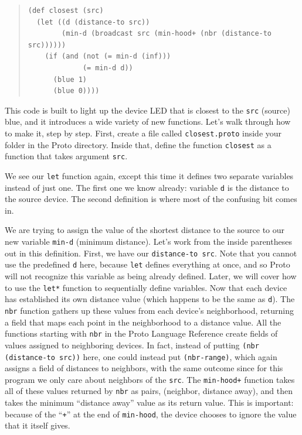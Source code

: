 \documentclass{article}
\newcommand\var[1]{{\tt #1}}
\newcommand\qvar[1]{``{\tt #1}''}
\begin{document}
\begin{quote}
\begin{verbatim}
(def closest (src) 
  (let ((d (distance-to src)) 
        (min-d (broadcast src (min-hood+ (nbr (distance-to src)))))) 
    (if (and (not (= min-d (inf))) 
             (= min-d d)) 
      (blue 1)
      (blue 0))))
\end{verbatim}
\end{quote}

This code is built to light up the device LED that is closest to the
\var{src} (source) blue, and it introduces a wide variety of new
functions.  Let's walk through how to make it, step by step.  First,
create a file called \var{closest.proto} inside your folder in the
Proto directory.  Inside that, define the function \var{closest} as a
function that takes argument \var{src}.

We see our \var{let} function again, except this time it defines two
separate variables instead of just one.  The first one we know
already: variable \var{d} is the distance to the source device. The
second definition is where most of the confusing bit comes in.

We are trying to assign the value of the shortest distance to the
source to our new variable \var{min-d} (minimum distance).  Let's work
from the inside parentheses out in this definition.  First, we have
our \var{distance-to src}.  Note that you cannot use the predefined
\var{d} here, because \var{let} defines everything at once, and so
Proto will not recognize this variable as being already defined.
Later, we will cover how to use the \var{let*} function to
sequentially define variables.  Now that each device has established its
own distance value (which happens to be the same as \var{d}).  The
\var{nbr} function gathers up these values from each device's
neighborhood, returning a field that maps each point in the
neighborhood to a distance value.  All the functions starting with
\var{nbr} in the Proto Language Reference create fields of values
assigned to neighboring devices.  In fact, instead of putting
\var{(nbr (distance-to src))} here, one could instead put
\var{(nbr-range)}, which again assigns a field of distances to
neighbors, with the same outcome since for this program we only care
about neighbors of the \var{src}.  The \var{min-hood+} function takes
all of these values returned by \var{nbr} as pairs, (neighbor,
distance away), and then takes the minimum ``distance away'' value as
its return value.  This is important: because of the \qvar{+} at the end
of \var{min-hood}, the device chooses to ignore the value that it
itself gives.  
\end{document}
